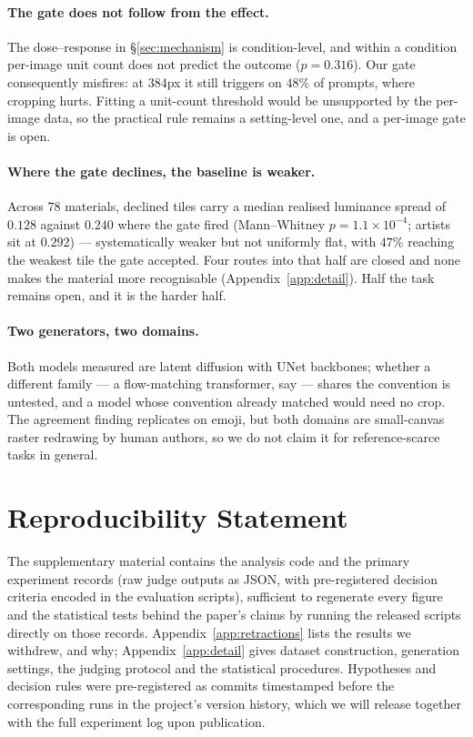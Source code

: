 \documentclass{article}
\begin{document}
\paragraph{The gate does not follow from the effect.} The dose--response in
\S\ref{sec:mechanism} is condition-level, and within a condition per-image
unit count does not predict the outcome ($p{=}0.316$). Our gate consequently
misfires: at 384px it still triggers on $48\%$ of prompts, where cropping
hurts. Fitting a unit-count threshold would be unsupported by the per-image
data, so the practical rule remains a setting-level one, and a per-image gate
is open.

\paragraph{Where the gate declines, the baseline is weaker.} Across 78
materials, declined tiles carry a median realised luminance spread of $0.128$
against $0.240$ where the gate fired (Mann--Whitney $p{=}1.1\times10^{-4}$;
artists sit at $0.292$) --- systematically weaker but not uniformly flat, with
$47\%$ reaching the weakest tile the gate accepted. Four routes into that half
are closed and none makes the material more recognisable
(Appendix~\ref{app:detail}). Half the task remains open, and it is the harder
half.


\paragraph{Two generators, two domains.} Both models measured are latent
diffusion with UNet backbones; whether a different family --- a flow-matching
transformer, say --- shares the convention is untested, and a model whose
convention already matched would need no crop. The agreement finding
replicates on emoji, but both domains are small-canvas raster redrawing by
human authors, so we do not claim it for reference-scarce tasks in general.


\label{endoflimit}
\section*{Reproducibility Statement}
The supplementary material contains the analysis code and the primary
experiment records (raw judge outputs as JSON, with pre-registered decision
criteria encoded in the evaluation scripts), sufficient to regenerate every
figure and the statistical tests
behind the paper's claims by running the released scripts directly on those
records. Appendix~\ref{app:retractions} lists the results we withdrew, and
why; Appendix~\ref{app:detail} gives dataset construction, generation
settings, the judging protocol and the statistical procedures. Hypotheses
and decision rules were pre-registered as commits timestamped before the
corresponding runs in the project's version history, which we will release
together with the full experiment log upon publication.
\end{document}
